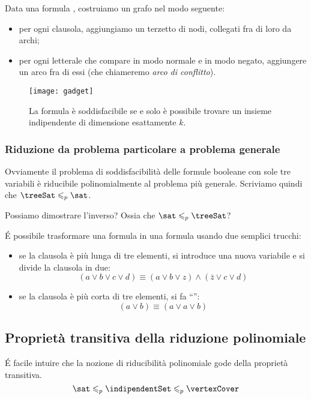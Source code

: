 Data una formula \treeSat, costruiamo un grafo nel modo seguente:
\begin{itemize}
    \item per ogni clausola, aggiungiamo un terzetto di nodi, collegati fra di loro da archi;
    \item per ogni letterale che compare in modo normale e in modo negato, aggiungere un arco fra di essi (che chiameremo \emph{arco di conflitto}).
\end{itemize}
\begin{figure}[H]\centering
    \texttt{[image: gadget]}
    \caption[Gadgets]{La formula {\treeSat} è soddisfacibile se e solo è possibile trovare un insieme indipendente di dimensione esattamente \(k\).}
\end{figure}

\subsubsection*{Riduzione da problema particolare a problema generale}

Ovviamente il problema di soddisfacibilità delle formule booleane con sole tre variabili è riducibile polinomialmente al problema più generale.
Scriviamo quindi che \(\treeSat \leqslant_p \sat\).

Possiamo dimostrare l'inverso? Ossia che \(\sat \leqslant_p \treeSat\)?

\'{E} possibile trasformare una formula {\sat} in una formula {\treeSat} usando due semplici trucchi:
\begin{itemize}
    \item se la clausola è più lunga di tre elementi, si introduce una nuova variabile e si divide la clausola in due:
    \[
        (a \lor b \lor c \lor d) \equiv (a \lor b \lor z) \land (\bar{z} \lor c \lor d)
    \]
    \item se la clausola è più corta di tre elementi, si fa \enquote{}:
    \[
        (a \lor b) \equiv (a \lor a \lor b)
    \]
\end{itemize}

\subsection{Proprietà transitiva della riduzione polinomiale}

\'{E} facile intuire che la nozione di riducibilità polinomiale gode della proprietà transitiva.
\[
    \sat \leqslant_p \indipendentSet \leqslant_p \vertexCover
\]

